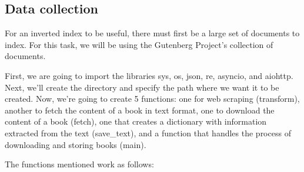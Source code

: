 \documentclass{article}
\begin{document}
\subsection{Data collection}

For an inverted index to be useful, there must first be a large set of documents to index.
For this task, we will be using the Gutenberg Project's collection of documents.

First, we are going to import the libraries
sys, os, json, re, asyncio, and aiohttp.
Next, we'll create the directory and specify the path where
we want it to be created. Now, we're going to create 5 functions:
one for web scraping (transform),
another to fetch the content of a book in text format,
one to download the content of a book (fetch),
one that creates a dictionary with information extracted
from the text (save\_text),
and a function that handles the process of downloading
and storing books (main).

The functions mentioned work as follows:
\end{document}
